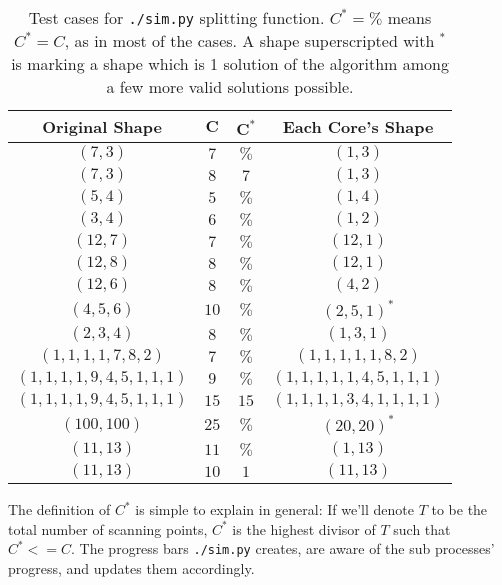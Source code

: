 \begin{table}
  \centering
  \begin{tabular}{cccc}
    \toprule
    \textbf{Original Shape} & $\mathbf{C}$ & $\mathbf{C^*}$ & \textbf{Each Core's Shape} \\
    \midrule
    $(7, 3)$                         & $7$  & $\%$ & $(1, 3)$ \\
    $(7, 3)$                         & $8$  & $7$  & $(1, 3)$ \\
    $(5, 4)$                         & $5$  & $\%$ & $(1, 4)$ \\
    $(3, 4)$                         & $6$  & $\%$ & $(1, 2)$ \\
    $(12, 7)$                        & $7$  & $\%$ & $(12, 1)$ \\
    $(12, 8)$                        & $8$  & $\%$ & $(12, 1)$ \\
    $(12, 6)$                        & $8$  & $\%$ & $(4, 2)$ \\
    $(4, 5, 6)$                      & $10$ & $\%$ & $(2, 5, 1)^*$ \\
    $(2, 3, 4)$                      & $8$  & $\%$ & $(1, 3, 1)$ \\
    $(1, 1, 1, 1, 7, 8, 2)$          & $7$  & $\%$ & $(1, 1, 1, 1, 1, 8, 2)$ \\
    $(1, 1, 1, 1, 9, 4, 5, 1, 1, 1)$ & $9$  & $\%$ & $(1, 1, 1, 1, 1, 4, 5, 1, 1, 1)$ \\
    $(1, 1, 1, 1, 9, 4, 5, 1, 1, 1)$ & $15$ & $15$ & $(1, 1, 1, 1, 3, 4, 1, 1, 1, 1)$ \\
    $(100, 100)$                     & $25$ & $\%$ & $(20, 20)^*$ \\
    $(11, 13)$                       & $11$ & $\%$ & $(1, 13)$ \\
    $(11, 13)$                       & $10$ & $1$  & $(11, 13)$ \\
    \bottomrule
  \end{tabular}
  \caption{Test cases for \texttt{./sim.py} splitting function. $C^* = \%$ means $C^* = C$, as in most of the cases. A shape superscripted with ${}^*$ is marking a shape which is 1 solution of the algorithm among a few more valid solutions possible.}
  \label{tbl:--cores-splitting-examples}
\end{table}

The definition of $C^*$ is simple to explain in general: If we'll denote $T$ to be the total number of scanning points, $C^*$ is the highest divisor of $T$ such that $C^* <= C$. The progress bars \texttt{./sim.py} creates, are aware of the sub processes' progress, and updates them accordingly.

